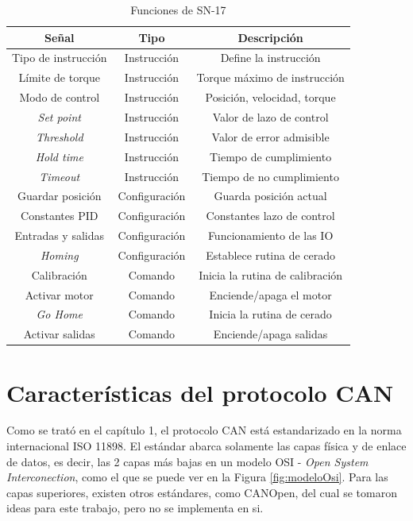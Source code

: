 \begin{table}[h]
	\centering
	\caption[Operaciones SN-17]{Funciones de SN-17}
	\begin{tabular}{c c c}    
		\toprule
		\textbf{Señal} 	 & \textbf{Tipo}  & \textbf{Descripción}\\
		\midrule
		Tipo de instrucción & Instrucción 	& Define la instrucción\\		
		Límite de torque 	& Instrucción	& Torque máximo de instrucción \\
		Modo de control		& Instrucción 	& Posición, velocidad, torque \\
		\textit{Set point}	& Instrucción 	& Valor de lazo de control \\
		\textit{Threshold}	& Instrucción 	& Valor de error admisible \\
		\textit{Hold time}	& Instrucción 	& Tiempo de cumplimiento \\
		\textit{Timeout}	& Instrucción 	& Tiempo de no cumplimiento \\
		Guardar posición	& Configuración & Guarda posición actual \\
		Constantes PID		& Configuración & Constantes lazo de control \\	
		Entradas y salidas	& Configuración & Funcionamiento de las IO \\
		\textit{Homing}		& Configuración & Establece rutina de cerado \\	
		Calibración			& Comando		& Inicia la rutina de calibración \\
		Activar motor		& Comando		& Enciende/apaga el motor \\
		\textit{Go Home}	& Comando		& Inicia la rutina de cerado \\
		Activar salidas		& Comando		& Enciende/apaga salidas \\	
		\bottomrule
		\hline
	\end{tabular}
	\label{tab:sn17_hoy}
\end{table}

\section{Características del protocolo CAN}

Como se trató en el capítulo 1, el protocolo CAN está estandarizado en la norma internacional ISO 11898\citep{web_ISO_CAN}. El estándar abarca solamente las capas física y de enlace de datos, es decir, las 2 capas más bajas en un modelo OSI - \textit{Open System Interconection}, como el que se puede ver en la Figura \ref{fig:modeloOsi}. Para las capas superiores, existen otros estándares, como CANOpen\protect\footnotemark, del cual se tomaron ideas para este trabajo, pero no se implementa en si.

